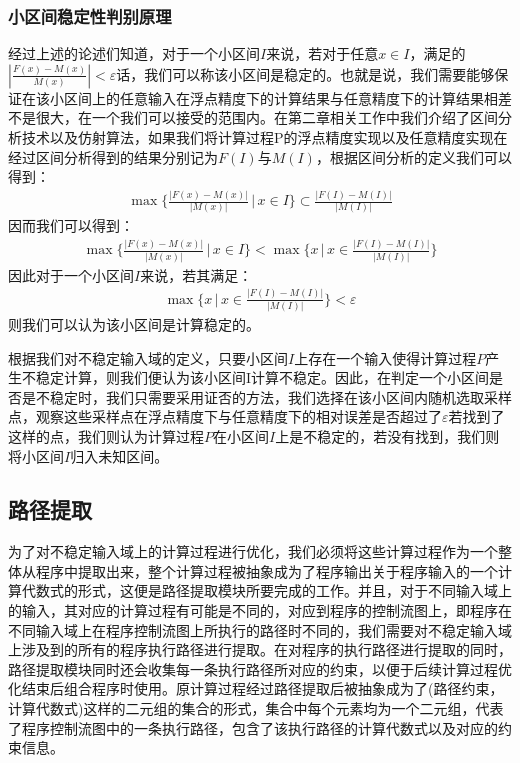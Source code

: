 \subsubsection{小区间稳定性判别原理}

经过上述的论述们知道，对于一个小区间$I$来说，若对于任意$x \in I$，满足的$|\frac{F(x)-M(x)}{M(x)}| < \varepsilon$话，我们可以称该小区间是稳定的。也就是说，我们需要能够保证在该小区间上的任意输入在浮点精度下的计算结果与任意精度下的计算结果相差不是很大，在一个我们可以接受的范围内。在第二章相关工作中我们介绍了区间分析技术以及仿射算法，如果我们将计算过程P的浮点精度实现以及任意精度实现在经过区间分析得到的结果分别记为$F(I)$与$M(I)$，根据区间分析的定义我们可以得到：
\begin{align*}
  \max\Big\lbrace \frac{|F(x)-M(x)|}{|M(x)|} \, \Big| \, x \in I \Big\rbrace \subset \frac{|F(I) - M(I)|}{|M(I)|}
\end{align*}
因而我们可以得到：
\begin{align*}
  \max\Big\lbrace \frac{|F(x)-M(x)|}{|M(x)|} \, \Big| \, x \in I \Big\rbrace < \max \Big\lbrace x \, \Big| \, x \in \frac{|F(I) - M(I)|}{|M(I)|} \Big\rbrace
\end{align*}
因此对于一个小区间$I$来说，若其满足：
\begin{align*}
  \max \Big\lbrace x \, \Big| \, x \in \frac{|F(I) - M(I)|}{|M(I)|} \Big\rbrace < \varepsilon
\end{align*}
则我们可以认为该小区间是计算稳定的。

根据我们对不稳定输入域的定义，只要小区间$I$上存在一个输入使得计算过程$P$产生不稳定计算，则我们便认为该小区间I计算不稳定。因此，在判定一个小区间是否是不稳定时，我们只需要采用证否的方法，我们选择在该小区间内随机选取采样点，观察这些采样点在浮点精度下与任意精度下的相对误差是否超过了$\varepsilon$若找到了这样的点，我们则认为计算过程$P$在小区间$I$上是不稳定的，若没有找到，我们则将小区间$I$归入未知区间。

\subsection{路径提取}
为了对不稳定输入域上的计算过程进行优化，我们必须将这些计算过程作为一个整体从程序中提取出来，整个计算过程被抽象成为了程序输出关于程序输入的一个计算代数式的形式，这便是路径提取模块所要完成的工作。并且，对于不同输入域上的输入，其对应的计算过程有可能是不同的，对应到程序的控制流图上，即程序在不同输入域上在程序控制流图上所执行的路径时不同的，我们需要对不稳定输入域上涉及到的所有的程序执行路径进行提取。在对程序的执行路径进行提取的同时，路径提取模块同时还会收集每一条执行路径所对应的约束，以便于后续计算过程优化结束后组合程序时使用。原计算过程经过路径提取后被抽象成为了(路径约束，计算代数式)这样的二元组的集合的形式，集合中每个元素均为一个二元组，代表了程序控制流图中的一条执行路径，包含了该执行路径的计算代数式以及对应的约束信息。

